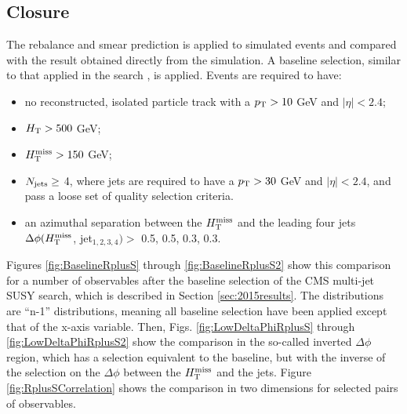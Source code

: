 \subsection{Closure}
The rebalance and smear prediction is applied to simulated events and compared with the result obtained directly from the simulation. A baseline selection, similar to that applied in the search \cite{Khachatryan:2016kdk}, is applied. Events are required to have:
\begin{itemize}
\item no reconstructed, isolated particle track with a $p_{\text{T}}>10$ GeV and $|\eta|<2.4$;
\item $H_{\rm T}>500$ GeV;
\item $H_{\text{T}}^{\rm miss}>150$ GeV;
\item $N_{\rm jets}\geq$ 4, where jets are required to have a $p_{\text{T}}>30$ GeV and $|\eta|<2.4$, and pass a loose set of quality selection criteria.
\item an azimuthal separation between the $H_{\text{T}}^{\rm miss}$ and the leading four jets $\Delta\phi(H_{\text{T}}^{\rm miss}$, jet$_{1,2,3,4})>$ 0.5, 0.5, 0.3, 0.3.
\end{itemize}
Figures \ref{fig:BaselineRplusS} through \ref{fig:BaselineRplusS2} show this comparison for a number of observables after the baseline selection of the CMS multi-jet SUSY search, which is described in Section \ref{sec:2015results}. The distributions are ``n-1'' distributions, meaning all baseline selection have been applied except that of the x-axis variable. Then, Figs. \ref{fig:LowDeltaPhiRplusS} through \ref{fig:LowDeltaPhiRplusS2} show the comparison in the so-called inverted $\Delta \phi$ region, which has a selection equivalent to the baseline, but with the inverse of the selection on the $\Delta \phi$ between the $H_{\text{T}}^{\rm miss}$ and the jets. Figure \ref{fig:RplusSCorrelation} shows the comparison in two dimensions for selected pairs of observables. 

